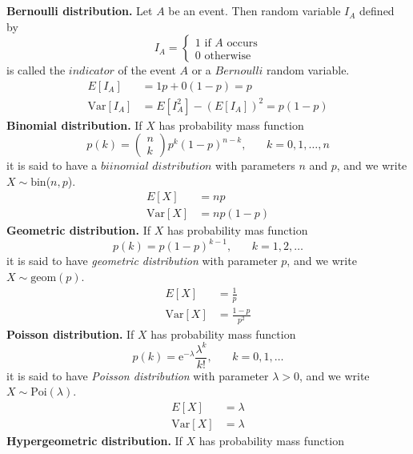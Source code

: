 \documentclass[12pt,a4paper]{report}
\author{Frederik Appel Vardinghus-Nielsen}
\begin{document}
\\\\
\textbf{Bernoulli distribution.} Let $A$ be an event. Then random variable $I_A$ defined by
\begin{equation}
I_A=
\begin{cases}
1\text{ if $A$ occurs}\\
0\text{ otherwise}
\end{cases}
\end{equation}
is called the $indicator$ of the event $A$ or a $Bernoulli$ random variable.
\begin{align*}
E[I_A]&=1p+0(1-p)=p\\
\text{Var}[I_A]&=E[I_A^2]-(E[I_A])^2=p(1-p)
\end{align*}
\textbf{Binomial distribution.} If $X$ has probability mass function
\begin{equation}
p(k)=\begin{pmatrix}n\\k\end{pmatrix}p^k(1-p)^{n-k},\phantom{mm}k=0,1,\ldots,n
\end{equation}
it is said to have a $biinomial$ $distribution$ with parameters $n$ and $p$, and we write $X\sim\text{bin}$($n,p$).
\begin{align*}
E[X]&=np\\
\text{Var}[X]&=np(1-p)
\end{align*}
\textbf{Geometric distribution.} If $X$ has probability mas function
\begin{equation}
p(k)=p(1-p)^{k-1},\phantom{mm}k=1,2,\ldots
\end{equation}
it is said to have \textit{geometric distribution} with parameter $p$, and we write $X\sim\text{geom}(p)$.
\begin{align*}
E[X]&=\frac{1}{p}\\
\text{Var}[X]&=\frac{1-p}{p^2}
\end{align*}
\textbf{Poisson distribution.} If $X$ has probability mass function
\begin{equation}
p(k)=\mathrm{e}^{-\lambda}\frac{\lambda^k}{k!},\phantom{mm}k=0,1,\ldots
\end{equation}
it is said to have \textit{Poisson distribution} with parameter $\lambda>0$, and we write $X\sim\text{Poi}(\lambda)$.
\begin{align*}
E[X]&=\lambda\\
\text{Var}[X]&=\lambda
\end{align*}
\textbf{Hypergeometric distribution.} If $X$ has probability mass function
\end{document}
